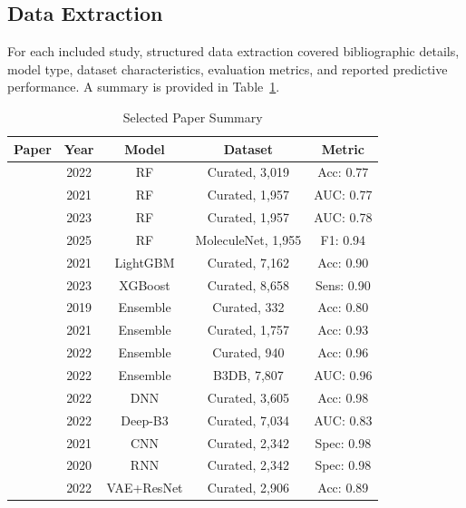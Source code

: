 \documentclass[conference]{IEEEtran}
\begin{document}
\subsection{Data Extraction}

For each included study, structured data extraction covered
bibliographic details, model type, dataset characteristics, evaluation
metrics, and reported predictive performance. A summary is provided in
Table~\ref{tab:papers_table}.

\begin{table}[htbp]
\centering
\caption{Selected Paper Summary}
\label{tab:papers_table}
\begin{tabularx}{\columnwidth}{ccccc}
\hline
\textbf{Paper} & \textbf{Year} & \textbf{Model} & \textbf{Dataset} & \textbf{Metric} \\
\hline
\cite{Kumar2022b}      & 2022 & RF           & Curated, 3,019     & Acc: 0.77  \\
\cite{Sakiyama2021}    & 2021 & RF           & Curated, 1,957     & AUC: 0.77  \\
\cite{Sakiyama2023}    & 2023 & RF           & Curated, 1,957     & AUC: 0.78  \\
\cite{Zhu2025}         & 2025 & RF           & MoleculeNet, 1,955 & F1: 0.94   \\
\cite{Shaker2021}      & 2021 & LightGBM     & Curated, 7,162     & Acc: 0.90  \\
\cite{Cornelissen2023} & 2023 & XGBoost      & Curated, 8,658     & Sens: 0.90 \\
\hline
\cite{Plisson2019}     & 2019 & Ensemble     & Curated, 332       & Acc: 0.80  \\
\cite{Liu2021}         & 2021 & Ensemble     & Curated, 1,757     & Acc: 0.93  \\
\cite{Yu2022}          & 2022 & Ensemble     & Curated, 940       & Acc: 0.96  \\
\cite{Ansari2022}      & 2022 & Ensemble     & B3DB, 7,807        & AUC: 0.96  \\
\cite{Kumar2022}       & 2022 & DNN          & Curated, 3,605     & Acc: 0.98  \\
\cite{Tang2022}        & 2022 & Deep-B3      & Curated, 7,034     & AUC: 0.83  \\
\cite{Alsenan2021}     & 2021 & CNN          & Curated, 2,342     & Spec: 0.98 \\
\cite{Alsenan2020}     & 2020 & RNN          & Curated, 2,342     & Spec: 0.98 \\
\cite{Tevosyan2022}    & 2022 & VAE+ResNet   & Curated, 2,906     & Acc: 0.89  \\

\end{tabularx}
\end{table}
\end{document}
